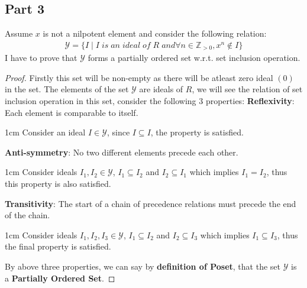 \documentclass{article}
\let\bold\textbf
\newenvironment{myenv}{\begin{adjustwidth}{1cm}{}}{\end{adjustwidth}}
\begin{document}
{  \subsection{Part 3}{
    Assume $x$ is not a nilpotent element and consider the following relation:
    \begin{align*}
      \mathcal{Y}=\{I \mid I \; is \; an \; ideal \; of \; R \; and \forall n \in {\mathbb{Z}}_{>0},x^n \notin I \}
    \end{align*}
    I have to prove that $\mathcal{Y}$ forms a partially ordered set w.r.t. set inclusion operation.
    \begin{proof}
      Firstly this set will be non-empty as there will be atleast zero ideal $(0)$ in the set. \newline
      The elements of the set $\mathcal{Y}$ are ideals of $R$, we will see the relation of set inclusion operation in this set, consider the following $3$ properties: \newline
      \bold{Reflexivity}: Each element is comparable to itself.
      \begin{myenv}
        Consider an ideal $I \in \mathcal{Y}$, since $I \subseteq I$, the property is satisfied.
      \end{myenv}
      \bold{Anti-symmetry}: No two different elements precede each other.
      \begin{myenv}
        Consider ideals $I_1,I_2 \in \mathcal{Y}$, $I_1 \subseteq I_2$ and $I_2 \subseteq I_1$ which implies $I_1=I_2$, thus this property is also satisfied.
      \end{myenv}
      \bold{Transitivity}: The start of a chain of precedence relations must precede the end of the chain.
      \begin{myenv}
        Consider ideals $I_1,I_2,I_3 \in \mathcal{Y}$, $I_1 \subseteq I_2$ and $I_2 \subseteq I_3$ which implies $I_1 \subseteq I_3$, thus the final property is satisfied.
      \end{myenv}
      By above three properties, we can say by \bold{definition of Poset}, that the set $\mathcal{Y}$ is a \bold{Partially Ordered Set}.
    \end{proof}
  }
}
\end{document}
